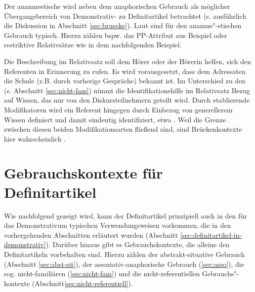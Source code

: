 \begin{exe}
	\ex \label{ex:kinder}    
\end{exe}

Der anamnestische wird neben dem anaphorischen Gebrauch als möglicher Übergangsbereich von Demonstrativ- zu Definitartikel betrachtet (s. ausführlich die Diskussion in Abschnitt \ref{sec:bruecke}). Laut \textcite[73]{Himmelmann1997} sind für den anamne"-stischen Gebrauch  typisch. Hierzu zählen bspw. das PP-Attribut  aus Beispiel  oder restriktive Relativsätze wie in dem nachfolgenden Beispiel.

\begin{exe}
	\ex \label{ex:film}     
\end{exe}
\noindent 
Die Beschreibung im Relativsatz soll dem Hörer oder der Hörerin helfen, sich den Referenten in Erinnerung zu rufen. Es wird vorausgesetzt, dass dem Adressaten die Schule (z.B. durch vorherige Gespräche) bekannt ist. Im Unterschied zu den  (s. Abschnitt \ref{sec:nicht-fam}) nimmt die Identifikationshilfe im Relativsatz Bezug auf Wissen, das nur von den Diskursteilnehmern geteilt wird. Durch etablierende Modifikatoren wird ein Referent hingegen durch Einbezug von generellerem Wissen definiert und damit eindeutig identifiziert, etwa . Weil die Grenze zwischen diesen beiden Modifikationsarten fließend sind, sind Brückenkontexte hier wahrscheinlich \parencite[s. zur ausführlichen Diskussion][79--80]{Himmelmann1997}. 

\section{Gebrauchskontexte für Definitartikel}\label{sec:definitartikel}

Wie nachfolgend gezeigt wird, kann der Definitartikel prinzipiell auch in den für das Demonstrativum typischen Verwendungsweisen vorkommen, die in den vorhergehenden Abschnitten erläutert wurden (Abschnitt \ref{sec:definitartikel-in-demonstrativ}). Darüber hinaus gibt es Gebrauchskontexte, die alleine den Definitartikeln vorbehalten sind. Hierzu zählen der abstrakt-situative Gebrauch (Abschnitt \ref{sec:abst-sit}), der assoziativ-anaphorische Gebrauch (\ref{sec:asso}), die sog. nicht-familiären (\ref{sec:nicht-fam}) und die nicht-referentiellen Gebrauchs"-kontexte (Abschnitt\ref{sec:nicht-referentiell}). 

